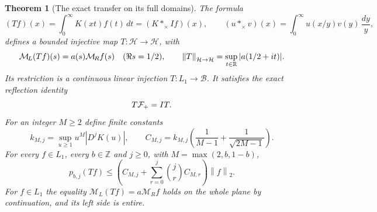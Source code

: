 \documentclass[11pt]{article}
\newtheorem{theorem}{Theorem}[section]
\newcommand{\B}{\mathscr B}\newcommand{\HH}{\mathcal H}
\newcommand{\ML}{\mathcal M_{\!L}}\newcommand{\MR}{\mathcal M_{\!R}}
\newcommand{\norm}[1]{\left\lVert#1\right\rVert}
\begin{document}
\begin{theorem}[The exact transfer on its full domains]\label{thm:T}
The formula
\begin{equation}\label{eq:T}
 (Tf)(x)=\int_0^\infty K(xt)f(t)\,dt
       =(K*_\times If)(x),\qquad
 (u*_\times v)(x)=\int_0^\infty u(x/y)v(y)\,\frac{dy}{y},
\end{equation}
defines a bounded injective map $T:\HH\to\HH$, with
\begin{equation}\label{eq:Tsymbol}
 \ML(Tf)(s)=a(s)\MR f(s)\quad(\Re s=1/2),\qquad
 \norm T_{\HH\to\HH}=\sup_{t\in\R}|a(1/2+it)|.
\end{equation}
Its restriction is a continuous linear injection
$T:L_1\to\B$. It satisfies the exact reflection identity
\begin{equation}\label{eq:Tsym}
 T\mathcal F_+=IT.
\end{equation}
For an integer $M\geq2$ define finite constants
\begin{equation}\label{eq:constants}
 k_{M,j}=\sup_{u\geq1}u^M|D^jK(u)|,\qquad
 C_{M,j}=k_{M,j}\left(\frac1{M-1}+\frac1{\sqrt{2M-1}}\right).
\end{equation}
For every $f\in L_1$, every $b\in\mathbb Z$ and $j\geq0$,
with $M=\max(2,b,1-b)$,
\begin{equation}\label{eq:strongbound}
 p_{b,j}(Tf)\leq
 \left(C_{M,j}+\sum_{r=0}^j\binom jr C_{M,r}\right)\norm f_2.
\end{equation}
For $f\in L_1$ the equality $\ML(Tf)=a\MR f$ holds on the
whole plane by continuation, and its left side is entire.
\end{theorem}
\end{document}
